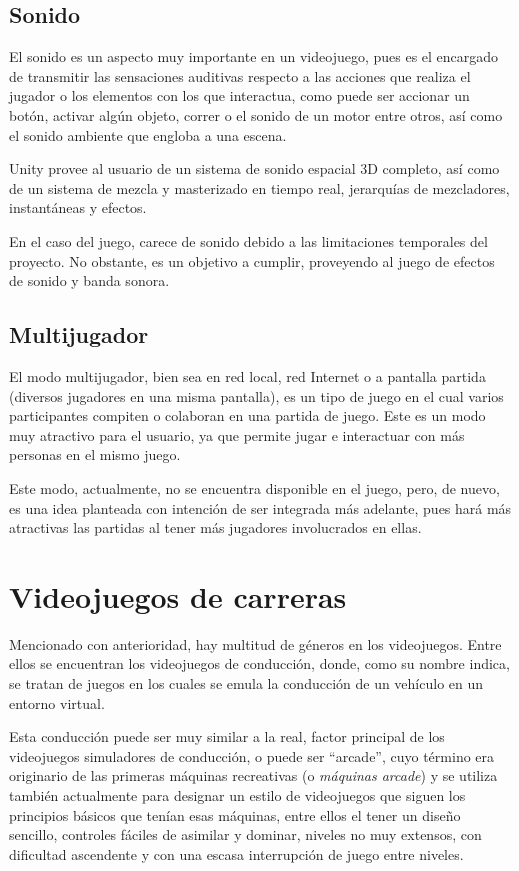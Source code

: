 \subsection{Sonido}

El sonido es un aspecto muy importante en un videojuego, pues es el encargado de transmitir las sensaciones auditivas respecto a las acciones que realiza el jugador o los elementos con los que interactua, como puede ser accionar un botón, activar algún objeto, correr o el sonido de un motor entre otros, así como el sonido ambiente que engloba a una escena.

Unity provee al usuario de un sistema de sonido espacial 3D completo, así como de un sistema de mezcla y masterizado en tiempo real, jerarquías de mezcladores, instantáneas y efectos.

En el caso del juego, carece de sonido debido a las limitaciones temporales del proyecto. No obstante, es un objetivo a cumplir, proveyendo al juego de efectos de sonido y banda sonora.

\subsection{Multijugador}

El modo multijugador, bien sea en red local, red Internet o a pantalla partida (diversos jugadores en una misma pantalla), es un tipo de juego en el cual varios participantes compiten o colaboran en una partida de juego. Este es un modo muy atractivo para el usuario, ya que permite jugar e interactuar con más personas en el mismo juego.

Este modo, actualmente, no se encuentra disponible en el juego, pero, de nuevo, es una idea planteada con intención de ser integrada más adelante, pues hará más atractivas las partidas al tener más jugadores involucrados en ellas.

\section{Videojuegos de carreras} 

Mencionado con anterioridad, hay multitud de géneros en los videojuegos. Entre ellos se encuentran los videojuegos de conducción, donde, como su nombre indica, se tratan de juegos en los cuales se emula la conducción de un vehículo en un entorno virtual. 

Esta conducción puede ser muy similar a la real, factor principal de los videojuegos simuladores de conducción, o puede ser ``arcade'', cuyo término era originario de las primeras máquinas recreativas (o \textit{máquinas arcade}) y se utiliza también actualmente para designar un estilo de videojuegos que siguen los principios básicos que tenían esas máquinas, entre ellos el tener un diseño sencillo, controles fáciles de asimilar y dominar, niveles no muy extensos, con dificultad ascendente y con una escasa interrupción de juego entre niveles.

